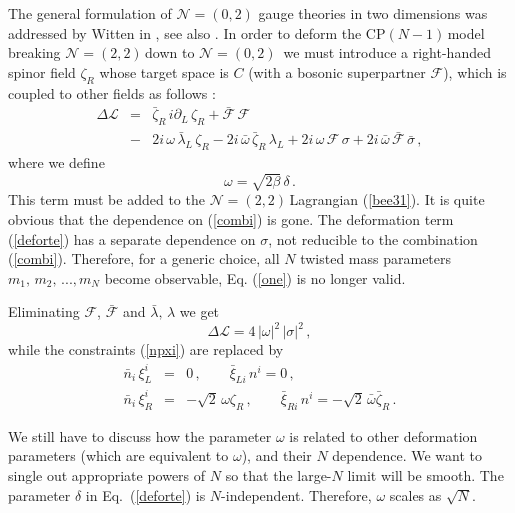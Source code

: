 \documentclass[epsfig,12pt]{article}
\def\beq{\begin{equation}}
\def\eeq{\end{equation}}
\def\beqn{\begin{eqnarray}}
\def\eeqn{\end{eqnarray}}
\newcommand{\ntt}{${\mathcal N}=(2,2)\,$}
\newcommand{\nzt}{${\mathcal N}=(0,2)\,$}
\newcommand{\cpn}{CP$(N-1)\,$}
\newcommand{\cell}{{\mathcal L}}
\newcommand{\pt}{\partial}
\newcommand{\cf}{${\mathcal F}$}
\newcommand{\cfe}{{\mathcal F}}
\def\beqn{\begin{eqnarray}}
\def\eeqn{\end{eqnarray}}
\def\beq{\begin{equation}}
\def\eeq{\end{equation}}
\newcommand{\ntwoo}{${\mathcal N}= \left(0,2\right) $ }
\begin{document}
The general formulation of \ntwoo gauge theories in two dimensions was addressed by Witten in 
\cite{W93}, see also \cite{Witten:2005px}.
In order to deform the \cpn model breaking \ntt down to \mbox{\nzt}
we must introduce a right-handed spinor field $\zeta_R$ whose  target space is $C$ 
(with a bosonic superpartner \cf), which is coupled to other fields as follows
\cite{EdTo,SY1}:
\beqn
\Delta\cell 
&=&
\bar\zeta_R\, i\pt_L\, \zeta_R   +\bar\cfe\,\cfe
	\nonumber\\[2mm]
&-&
 2i\, \omega \, \bar\lambda_L\, \zeta_R -  2i\, \bar{\omega} \, \bar\zeta_R\, \lambda_L +
	 2i\, \omega \, \cfe\, \sigma +
 2i\, \bar{\omega} \, \bar\cfe\, \bar{\sigma}\,,
 \label{deforte}
\eeqn
where we define
\beq
\omega = \sqrt{2\beta}\,\delta\,.
\label{deffp}
\eeq
This term must be added to the \ntt Lagrangian (\ref{bee31}). 
It is quite obvious that the dependence on (\ref{combi}) is gone. 
The deformation term (\ref{deforte}) has a separate dependence on $\sigma$, not reducible to the
combination (\ref{combi}). Therefore, for a generic choice, all $N$ twisted mass
parameters $m_1,\,m_2,\, ..., m_N$ become observable, Eq. (\ref{one}) is no longer valid.

\vspace{1mm}

Eliminating \cf, $\bar\cfe$  and $\bar\lambda ,\,\lambda$ we get
\beq
\Delta\cell = 4\, |\omega |^2\,|\sigma |^2\,,
\label{deffpp}
\eeq
while the constraints (\ref{npxi}) are replaced by
\beqn
\bar{n}_i\,\xi^i_L
&= &
0\,,\qquad \bar\xi_{Li}\,n^i = 0\,,
\nonumber\\[2mm]
\bar{n}_i\,\xi^i_R
&= &
 -\sqrt{2}\,\omega\zeta_R\,,\qquad \bar\xi_{Ri}\,n^i =  -\sqrt{2}\,\bar\omega\bar\zeta_R\,.
\label{npxip}
\eeqn

We still have to discuss how the parameter $\omega$ is related to other
deformation parameters (which are equivalent to $\omega$), and their $N$ dependence.
We want to single out appropriate powers of $N$ so that the large-$N$ limit will be smooth.
The parameter $\delta$ in Eq.~(\ref{deforte}) is $N$-independent. Therefore, $\omega$ scales as
$\sqrt N$.
\end{document}
